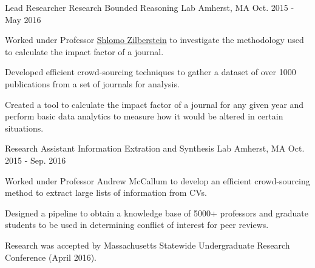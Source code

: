 \begin{cventries}
    \vspace{-7pt}
  \cventry
    {Lead Researcher}
    {Research Bounded Reasoning Lab}
    {Amherst, MA}
    {Oct. 2015 - May 2016}
    {
      \begin{cvitems}
        \item {Worked under Professor {\href{http://rbr.cs.umass.edu/shlomo/}{Shlomo Zilberstein}} to investigate the methodology used to calculate the impact factor of a journal.}
        \item {Developed efficient crowd-sourcing techniques to gather a dataset of over 1000 publications from a set of journals for analysis.}
        \item{Created a tool to calculate the impact factor of a journal for any given year and perform basic data analytics to measure how it would be altered in certain situations.}
      \end{cvitems}
    }
 
\vspace{-18pt}
 
  \cventry
    {Research Assistant}
    {Information Extration and Synthesis Lab}
    {Amherst, MA}
    {Oct. 2015 - Sep. 2016}
    {
      \begin{cvitems}
        \item {Worked under Professor Andrew McCallum to develop an efficient crowd-sourcing method to extract large lists of information from CVs.}
        \item {Designed a pipeline to obtain a knowledge base of 5000+ professors and graduate students to be used in determining conflict of interest for peer reviews.}
        \item {Research was accepted by Massachusetts Statewide Undergraduate Research Conference (April 2016).}
      \end{cvitems}
    }
\end{cventries}
